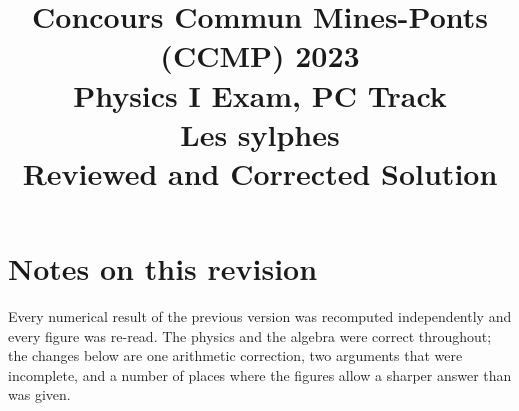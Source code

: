 \documentclass[11pt,a4paper]{article}
\title{Concours Commun Mines-Ponts (CCMP) 2023\\[0.25em]
\large Physics I Exam, PC Track\\[0.8em]
\Large Les sylphes\\[0.25em]
\large Reviewed and Corrected Solution}
\author{}
\date{}
\begin{document}
\maketitle

\tableofcontents
\newpage

\section*{Notes on this revision}

Every numerical result of the previous version was recomputed independently and
every figure was re-read. The physics and the algebra were correct throughout;
the changes below are one arithmetic correction, two arguments that were
incomplete, and a number of places where the figures allow a sharper answer than
was given.
\end{document}

